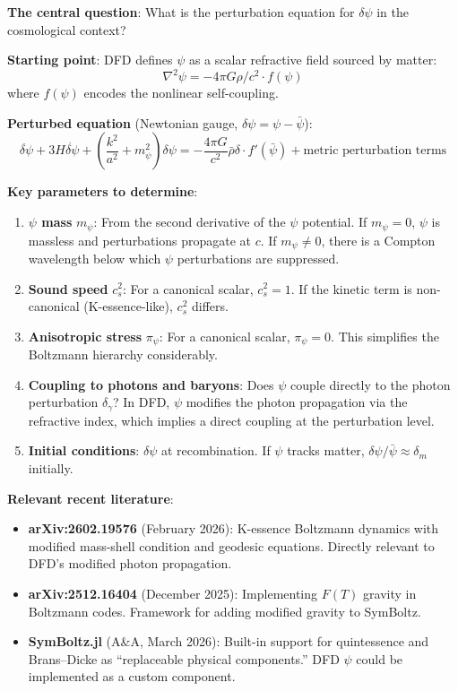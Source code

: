 \documentclass[11pt,a4paper]{article}
\begin{document}
\begin{tcolorbox}[colback=yellow!5!white, colframe=yellow!60!black,
  title={Phase 0B: $\psi$ Perturbation Theory --- Theoretical Framework (NEW)}]

\textbf{The central question}: What is the perturbation equation for $\delta\psi$ in the cosmological context?

\textbf{Starting point}: DFD defines $\psi$ as a scalar refractive field sourced by matter:
\begin{equation}
\nabla^2 \psi = -4\pi G \rho / c^2 \cdot f(\psi)
\end{equation}
where $f(\psi)$ encodes the nonlinear self-coupling.

\textbf{Perturbed equation} (Newtonian gauge, $\delta\psi = \psi - \bar{\psi}$):
\begin{equation}
\ddot{\delta\psi} + 3H\dot{\delta\psi} + \left(\frac{k^2}{a^2} + m_\psi^2\right)\delta\psi = -\frac{4\pi G}{c^2} \bar{\rho} \delta \cdot f'(\bar{\psi}) + \text{metric perturbation terms}
\end{equation}

\textbf{Key parameters to determine}:
\begin{enumerate}
\item \textbf{$\psi$ mass} $m_\psi$: From the second derivative of the $\psi$ potential. If $m_\psi = 0$, $\psi$ is massless and perturbations propagate at $c$. If $m_\psi \neq 0$, there is a Compton wavelength below which $\psi$ perturbations are suppressed.
\item \textbf{Sound speed} $c_s^2$: For a canonical scalar, $c_s^2 = 1$. If the kinetic term is non-canonical (K-essence-like), $c_s^2$ differs.
\item \textbf{Anisotropic stress} $\pi_\psi$: For a canonical scalar, $\pi_\psi = 0$. This simplifies the Boltzmann hierarchy considerably.
\item \textbf{Coupling to photons and baryons}: Does $\psi$ couple directly to the photon perturbation $\delta_\gamma$? In DFD, $\psi$ modifies the photon propagation via the refractive index, which implies a direct coupling at the perturbation level.
\item \textbf{Initial conditions}: $\delta\psi$ at recombination. If $\psi$ tracks matter, $\delta\psi / \bar{\psi} \approx \delta_m$ initially.
\end{enumerate}

\textbf{Relevant recent literature}:
\begin{itemize}
\item \textbf{arXiv:2602.19576} (February 2026): K-essence Boltzmann dynamics with modified mass-shell condition and geodesic equations. Directly relevant to DFD's modified photon propagation.
\item \textbf{arXiv:2512.16404} (December 2025): Implementing $F(T)$ gravity in Boltzmann codes. Framework for adding modified gravity to SymBoltz.
\item \textbf{SymBoltz.jl} (A\&A, March 2026): Built-in support for quintessence and Brans--Dicke as ``replaceable physical components.'' DFD $\psi$ could be implemented as a custom component.
\end{itemize}


\end{tcolorbox}
\end{document}

